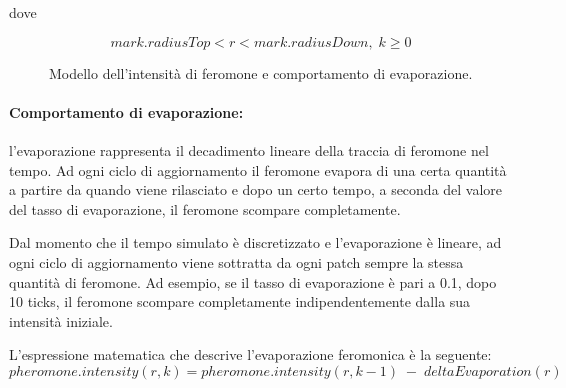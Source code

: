dove

\begin{equation*}
    mark.radiusTop < r < mark.radiusDown , \; k \ge 0
\end{equation*}

\begin{figure}[H] 
    \captionsetup{justification=centering, margin=2cm, font=footnotesize}
    \begin{center}
    \end{center}
    \caption{Modello dell'intensità di feromone e comportamento di evaporazione.}
    \label{evaporazione}
\end{figure}

\paragraph{Comportamento di evaporazione:} l’evaporazione rappresenta il decadimento lineare della traccia di feromone nel tempo. 
Ad ogni ciclo di aggiornamento il feromone evapora di una certa quantità a partire da quando viene rilasciato e dopo un certo tempo, a seconda del valore del tasso di evaporazione, il feromone scompare completamente. 

Dal momento che il tempo simulato è discretizzato e l’evaporazione è lineare, ad ogni ciclo di aggiornamento viene sottratta da ogni patch sempre la stessa quantità di feromone. 
Ad esempio, se il tasso di evaporazione è pari a 0.1, dopo 10 ticks, il feromone scompare completamente indipendentemente dalla sua intensità iniziale. 

L’espressione matematica che descrive l’evaporazione feromonica è la seguente:
\begin{equation*}
    pheromone.intensity(r,k) = pheromone.intensity(r,k-1) \; - \; deltaEvaporation(r)
\end{equation*}


